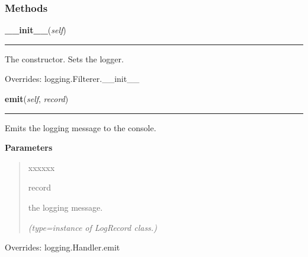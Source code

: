 
  \subsubsection{Methods}

    \vspace{0.5ex}

\hspace{.8\funcindent}\begin{boxedminipage}{\funcwidth}

    \raggedright \textbf{\_\_init\_\_}(\textit{self})

    \vspace{-1.5ex}

    \rule{\textwidth}{0.5\fboxrule}
\setlength{\parskip}{2ex}
    The constructor. Sets the logger.

\setlength{\parskip}{1ex}
      Overrides: logging.Filterer.\_\_init\_\_

    \end{boxedminipage}

    \vspace{0.5ex}

\hspace{.8\funcindent}\begin{boxedminipage}{\funcwidth}

    \raggedright \textbf{emit}(\textit{self}, \textit{record})

    \vspace{-1.5ex}

    \rule{\textwidth}{0.5\fboxrule}
\setlength{\parskip}{2ex}
    Emits the logging message to the console.

\setlength{\parskip}{1ex}
      \textbf{Parameters}
      \vspace{-1ex}

      \begin{quote}
        \begin{Ventry}{xxxxxx}

          \item[record]

          the logging message.

            {\it (type=instance of LogRecord class.)}

        \end{Ventry}

      \end{quote}

      Overrides: logging.Handler.emit

    \end{boxedminipage}


